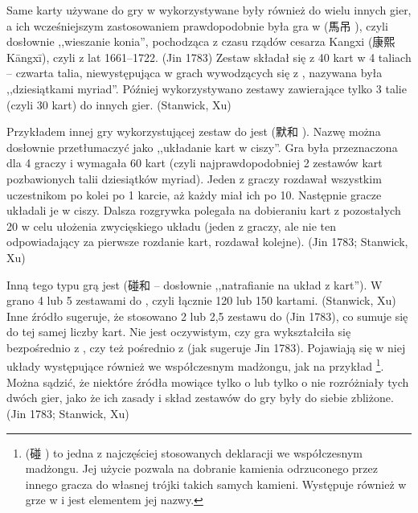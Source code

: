 Same karty używane do gry w  wykorzystywane były również do wielu
innych gier, a ich wcześniejszym zastosowaniem prawdopodobnie była gra w
 (馬吊 ), czyli dosłownie ,,wieszanie konia'',
pochodząca z czasu rządów cesarza Kangxi (康熙 Kāngxī), czyli z lat 1661--1722.
(Jin 1783) Zestaw  składał się z 40 kart w 4 taliach -- czwarta
talia, niewystępująca w grach wywodzących się z , nazywana była
,,dziesiątkami myriad''. Później wykorzystywano zestawy zawierające tylko 3
talie (czyli 30 kart) do innych gier. (Stanwick, Xu)

Przykładem innej gry wykorzystującej zestaw do  jest
 (默和 ). Nazwę  można dosłownie przetłumaczyć jako
,,układanie kart w ciszy''. Gra była przeznaczona dla 4 graczy i wymagała 60
kart (czyli najprawdopodobniej 2 zestawów kart  pozbawionych
talii dziesiątków myriad). Jeden z graczy rozdawał wszystkim uczestnikom po
kolei po 1 karcie, aż każdy miał ich po 10. Następnie gracze układali je w
ciszy. Dalsza rozgrywka polegała na dobieraniu kart z pozostałych 20 w celu
ułożenia zwycięskiego układu (jeden z graczy, ale nie ten odpowiadający za
pierwsze rozdanie kart, rozdawał kolejne). (Jin 1783; Stanwick, Xu)
% 


Inną tego typu grą jest  (碰和  -- dosłownie
,,natrafianie na układ z kart'').
W  grano 4 lub 5 zestawami do , czyli łącznie 120
lub 150 kartami. (Stanwick, Xu) Inne źródło sugeruje, że stosowano 2 lub 2,5
zestawu do  (Jin 1783), co sumuje się do tej samej liczby kart.
Nie jest oczywistym, czy gra wykształciła się bezpośrednio z ,
czy też pośrednio z  (jak sugeruje Jin 1783).
Pojawiają się w niej układy występujące również we współczesnym madżongu, jak na
przykład \footnote{ (碰 ) to jedna z
 najczęściej stosowanych deklaracji we współczesnym madżongu. Jej użycie pozwala
 na dobranie kamienia odrzuconego przez innego gracza do własnej trójki takich
 samych kamieni. Występuje również w grze w  i jest elementem jej
 nazwy.}. Można sądzić, że niektóre źródła mowiące tylko o  lub
 tylko o  nie rozróżniały tych dwóch gier, jako że ich zasady i
 skład zestawów do gry były do siebie zbliżone. (Jin 1783; Stanwick, Xu)

